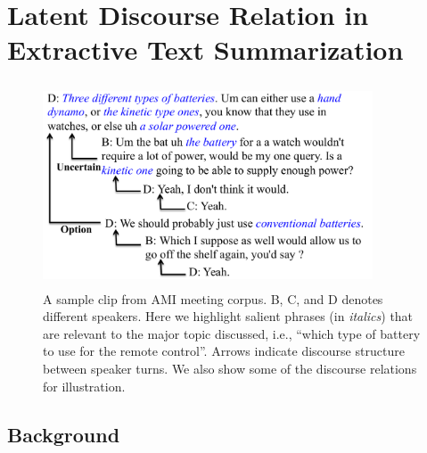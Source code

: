 \section{Latent Discourse Relation in Extractive Text Summarization} \label{sec:3-1}


\begin{figure}[t]
\centering
\includegraphics[width=98mm,height=60mm]{Images/snippet_intro.pdf}
\caption{ A sample clip from AMI meeting corpus. B, C, and D denotes different speakers. Here we highlight salient phrases (in \textit{italics}) that are relevant to the major topic discussed, i.e., ``which type of battery to use for the remote control''. Arrows indicate discourse structure between speaker turns. We also show some of the discourse relations for illustration.}
\label{fig:example_intro}
\end{figure}

\subsection{Background}

